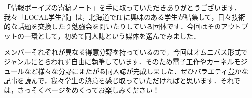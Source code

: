 「情報ボーイズの寄稿ノート」を手に取っていただきありがとうございます．我々「LOCAL学生部」は，北海道でITに興味のある学生が結集して，日々技術的な話題を交換したり勉強会を開いたりしている団体です．今回はそのアウトプットの一環として，初めて同人誌という媒体を選んでみました．

メンバーそれぞれが異なる得意分野を持っているので，今回はオムニバス形式でジャンルにとらわれず自由に執筆しています．そのため電子工作やカーネルモジュールなど様々な分野にまたがる同人誌が完成しました．ぜひバラエティ豊かな記事を読んで，我々学生の熱意を感じ取っていただければと思います．それでは，さっそくページをめくってお楽しみください！
